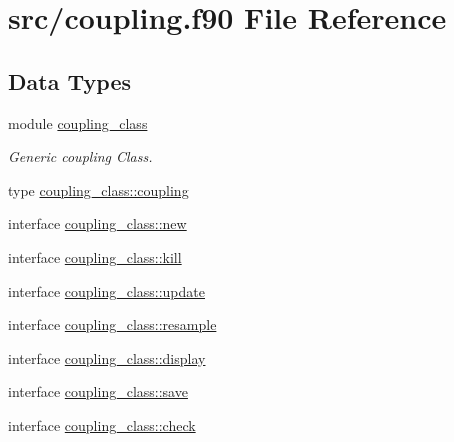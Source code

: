 \hypertarget{coupling_8f90}{\section{src/coupling.f90 File Reference}
\label{coupling_8f90}
}
\subsection*{Data Types}
\begin{DoxyCompactItemize}
\item 
module \hyperlink{classcoupling__class}{coupling\-\_\-class}
\begin{DoxyCompactList}\small\item\em Generic coupling Class. \end{DoxyCompactList}\item 
type \hyperlink{structcoupling__class_1_1coupling}{coupling\-\_\-class\-::coupling}
\item 
interface \hyperlink{interfacecoupling__class_1_1new}{coupling\-\_\-class\-::new}
\item 
interface \hyperlink{interfacecoupling__class_1_1kill}{coupling\-\_\-class\-::kill}
\item 
interface \hyperlink{interfacecoupling__class_1_1update}{coupling\-\_\-class\-::update}
\item 
interface \hyperlink{interfacecoupling__class_1_1resample}{coupling\-\_\-class\-::resample}
\item 
interface \hyperlink{interfacecoupling__class_1_1display}{coupling\-\_\-class\-::display}
\item 
interface \hyperlink{interfacecoupling__class_1_1save}{coupling\-\_\-class\-::save}
\item 
interface \hyperlink{interfacecoupling__class_1_1check}{coupling\-\_\-class\-::check}
\end{DoxyCompactItemize}
